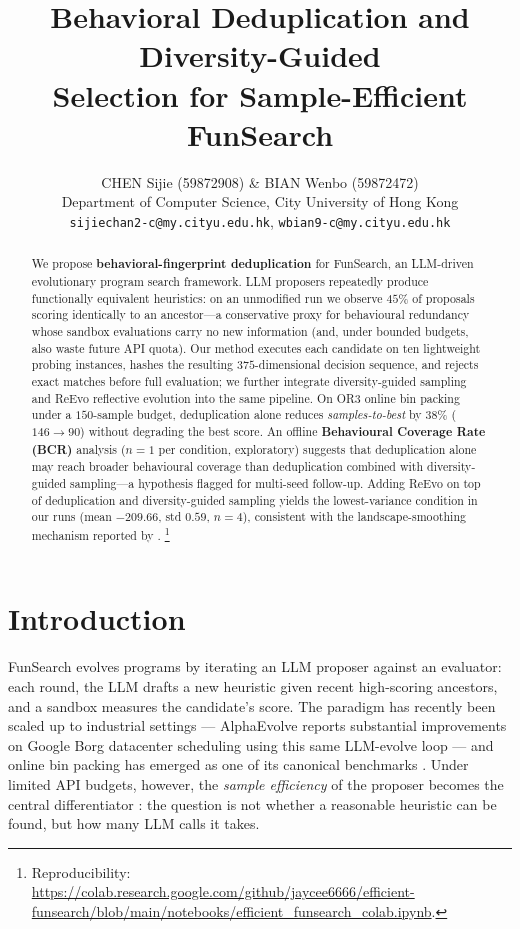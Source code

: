 \documentclass{article}
\title{Behavioral Deduplication and Diversity-Guided\\
Selection for Sample-Efficient FunSearch}
\author{CHEN Sijie (59872908) \& BIAN Wenbo (59872472) \\
Department of Computer Science, City University of Hong Kong \\
\texttt{sijiechan2-c@my.cityu.edu.hk}, \texttt{wbian9-c@my.cityu.edu.hk}}
\begin{document}
\maketitle
\lhead{}  %

\begin{abstract}
We propose \textbf{behavioral-fingerprint deduplication} for FunSearch, an LLM-driven
evolutionary program search framework. LLM proposers repeatedly produce functionally
equivalent heuristics: on an unmodified run we observe $45\%$ of proposals scoring
identically to an ancestor---a conservative proxy for behavioural redundancy whose
sandbox evaluations carry no new information (and, under bounded budgets, also
waste future API quota).
Our method executes each candidate on ten lightweight probing instances, hashes the
resulting $375$-dimensional decision sequence, and rejects exact matches before full
evaluation; we further integrate diversity-guided sampling and ReEvo reflective evolution
\citep{ye2024reevo} into the same pipeline.
On OR3 online bin packing under a $150$-sample budget, deduplication alone reduces
\emph{samples-to-best} by $38\%$ ($146\to 90$) without degrading the best score. An
offline \textbf{Behavioural Coverage Rate (BCR)} analysis ($n{=}1$ per condition,
exploratory) suggests that deduplication alone may reach broader behavioural coverage
than deduplication combined with diversity-guided sampling---a hypothesis flagged for
multi-seed follow-up. Adding ReEvo on top of deduplication and diversity-guided sampling
yields the lowest-variance condition in our runs (mean $-209.66$, std $0.59$, $n{=}4$),
consistent with the landscape-smoothing mechanism reported by \citet{ye2024reevo}.%
\footnote{Reproducibility: \url{https://colab.research.google.com/github/jaycee6666/efficient-funsearch/blob/main/notebooks/efficient_funsearch_colab.ipynb}.}
\end{abstract}

\section{Introduction}
\label{sec:intro}

FunSearch \citep{romera2023mathematical} evolves programs by iterating an LLM proposer
against an evaluator: each round, the LLM drafts a new heuristic given recent
high-scoring ancestors, and a sandbox measures the candidate's score. The paradigm has
recently been scaled up to industrial settings --- AlphaEvolve \citep{alphaevolve2025}
reports substantial improvements on Google Borg datacenter scheduling using this same
LLM-evolve loop --- and online bin packing has emerged as one of its canonical
benchmarks \citep{sim2025bin,liu2024eoh}. Under limited API budgets, however, the
\emph{sample efficiency} of the proposer becomes the central differentiator
\citep{ye2024reevo}: the question is not whether a reasonable heuristic can be found,
but how many LLM calls it takes.
\end{document}
